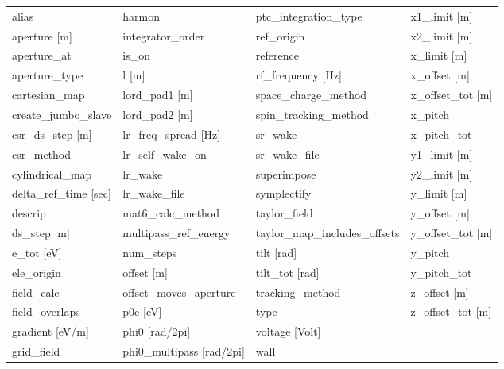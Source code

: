  \begin{tabular}{llll} \toprule
alias                            & harmon                           & ptc_integration_type             & x1_limit [m]                     \\
aperture [m]                     & integrator_order                 & ref_origin                       & x2_limit [m]                     \\
aperture_at                      & is_on                            & reference                        & x_limit [m]                      \\
aperture_type                    & l [m]                            & rf_frequency [Hz]                & x_offset [m]                     \\
cartesian_map                    & lord_pad1 [m]                    & space_charge_method              & x_offset_tot [m]                 \\
create_jumbo_slave               & lord_pad2 [m]                    & spin_tracking_method             & x_pitch                          \\
csr_ds_step [m]                  & lr_freq_spread [Hz]              & sr_wake                          & x_pitch_tot                      \\
csr_method                       & lr_self_wake_on                  & sr_wake_file                     & y1_limit [m]                     \\
cylindrical_map                  & lr_wake                          & superimpose                      & y2_limit [m]                     \\
delta_ref_time [sec]             & lr_wake_file                     & symplectify                      & y_limit [m]                      \\
descrip                          & mat6_calc_method                 & taylor_field                     & y_offset [m]                     \\
ds_step [m]                      & multipass_ref_energy             & taylor_map_includes_offsets      & y_offset_tot [m]                 \\
e_tot [eV]                       & num_steps                        & tilt [rad]                       & y_pitch                          \\
ele_origin                       & offset [m]                       & tilt_tot [rad]                   & y_pitch_tot                      \\
field_calc                       & offset_moves_aperture            & tracking_method                  & z_offset [m]                     \\
field_overlaps                   & p0c [eV]                         & type                             & z_offset_tot [m]                 \\
gradient [eV/m]                  & phi0 [rad/2pi]                   & voltage [Volt]                   &                                  \\
grid_field                       & phi0_multipass [rad/2pi]         & wall                             &                                  \\
 \bottomrule
 \end{tabular}
